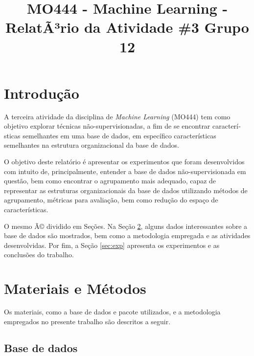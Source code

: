 \documentclass[conference]{IEEEtran}
\begin{document}
\title{MO444 - Machine Learning - RelatÃ³rio da Atividade \#3 Grupo 12}

\author{
\and
{}
}

\maketitle

\section{Introdução}

A terceira atividade da disciplina de \textit{Machine Learning} (MO444) tem como objetivo explorar técnicas não-supervisionadas, a fim de se encontrar caracterí­sticas semelhantes em uma base de dados, em específico caracterí­sticas semelhantes na estrutura organizacional da base de dados.

O objetivo deste relatório é apresentar os experimentos que foram desenvolvidos com intuito de, principalmente, entender a base de dados não-supervisionada em questão, bem como encontrar o agrupamento mais adequado, capaz de representar as estruturas organizacionais da base de dados utilizando métodos de agrupamento, métricas para avaliação, bem como redução do espaço de características.

O mesmo Ã© dividido em Seções. Na Seção \ref{sec:meto}, alguns dados interessantes sobre a base de dados são mostrados, bem como a metodologia empregada e as atividades desenvolvidas. Por fim, a Seção \ref{sec:exp} apresenta os experimentos e as conclusões do trabalho.

\section{Materiais e Métodos} \label{sec:meto}

Os materiais, como a base de dados e pacote utilizados, e a metodologia empregados no presente trabalho são descritos a seguir.

\subsection{Base de dados} \label{sec:base}
\end{document}
